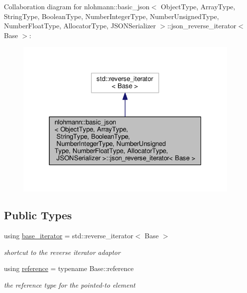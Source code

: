 Collaboration diagram for nlohmann\+:\+:basic\+\_\+json$<$ Object\+Type, Array\+Type, String\+Type, Boolean\+Type, Number\+Integer\+Type, Number\+Unsigned\+Type, Number\+Float\+Type, Allocator\+Type, J\+S\+O\+N\+Serializer $>$\+:\+:json\+\_\+reverse\+\_\+iterator$<$ Base $>$\+:\nopagebreak
\begin{figure}[H]
\begin{center}
\leavevmode
\includegraphics[width=313pt]{classnlohmann_1_1basic__json_1_1json__reverse__iterator__coll__graph}
\end{center}
\end{figure}
\subsection*{Public Types}
\begin{DoxyCompactItemize}
\item 
using \hyperlink{classnlohmann_1_1basic__json_1_1json__reverse__iterator_a5b7f3c5d86fe89a65d9552c1cac37261}{base\+\_\+iterator} = std\+::reverse\+\_\+iterator$<$ Base $>$
\begin{DoxyCompactList}\small\item\em shortcut to the reverse iterator adaptor \end{DoxyCompactList}\item 
using \hyperlink{classnlohmann_1_1basic__json_1_1json__reverse__iterator_ab0021ef2007fd338615360af404dcd4e}{reference} = typename Base\+::reference
\begin{DoxyCompactList}\small\item\em the reference type for the pointed-\/to element \end{DoxyCompactList}\end{DoxyCompactItemize}
